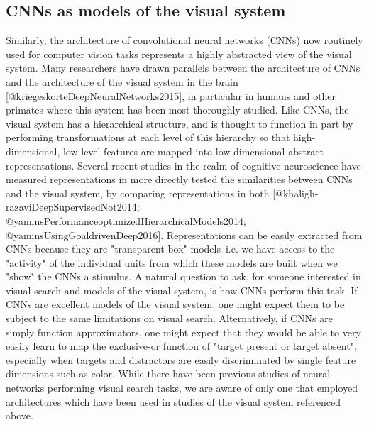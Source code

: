 \documentclass[10pt,letterpaper]{article}
\begin{document}
\subsection{CNNs as models of the visual system}
Similarly, the architecture of convolutional neural networks (CNNs) now routinely used for
computer vision tasks represents a highly abstracted view of the visual system.
Many researchers have drawn parallels between the architecture of CNNs and the 
architecture of the visual system in the brain [@kriegeskorteDeepNeuralNetworks2015], 
in particular in humans and other primates where this system has been most thoroughly 
studied. Like CNNs, the visual system has a hierarchical structure, and is thought to 
function in part by performing transformations at each level of this hierarchy so that 
high-dimensional, low-level features are mapped into low-dimensional abstract 
representations. Several recent studies in the realm of cognitive neuroscience 
have measured representations in more directly tested the similarities between CNNs and 
the visual system, by comparing representations in both [@khaligh-razaviDeepSupervisedNot2014; @yaminsPerformanceoptimizedHierarchicalModels2014; @yaminsUsingGoaldrivenDeep2016]. Representations 
can be easily extracted from CNNs because they are "transparent box" models--i.e. we have 
access to the "activity" of the individual units from which these models are built when 
we "show" the CNNs a stimulus.
A natural question to ask, for someone interested in visual search and models of the visual 
system, is how CNNs perform this task. If CNNs are excellent models of the visual system, 
one might expect them to be subject to the same limitations on visual search. Alternatively, 
if CNNs are simply function approximators, one might expect that they would be able to 
very easily learn to map the exclusive-or function of "target present or target absent", 
especially when targets and distractors are easily discriminated by single feature 
dimensions such as color. While there have been previous studies of neural networks 
performing visual search tasks, we are aware of only one that employed architectures 
which have been used in studies of the visual system referenced above.
\end{document}
